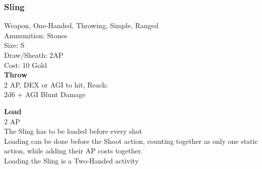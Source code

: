 \subsubsection{Sling}\label{weapon:sling}
Weapon, One-Handed, Throwing, Simple, Ranged\\
Ammunition: Stones\\
Size: S\\
Draw/Sheath: 2AP\\
Cost: 10 Gold\\

\textbf{Throw}\\
2 AP, DEX or AGI to hit,  Reach:\\
2d6 + \texttimes AGI Blunt Damage

\textbf{Load}\\
2 AP\\
The Sling has to be loaded before every shot\\
Loading can be done before the Shoot action, counting together as only one static action, while adding their AP costs together.\\
Loading the Sling is a Two-Handed activity
